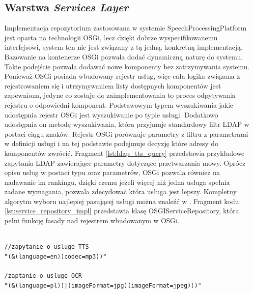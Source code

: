 \subsection{Warstwa \textit{Services Layer}}

Implementacja repozytorium zastosowana w systemie SpeechProcessingPlatform jest oparta na technologii OSGi, lecz dzięki dobrze wyspecifikowanemu interfejsowi, system ten nie jest związany z tą jedną, konkretną implementacją. Bazowanie na kontenerze OSGi pozwala dodać dynamiczną naturę do systemu. Takie podejście pozwala dodawać nowe komponenty bez zatrzymywania systemu. Ponieważ OSGi posiada wbudowany rejestr usług, więc cała logika związana z rejestrowaniem się i utrzymywaniem listy dostępnych komponentów jest zapewniona, jedyne co zostaje do zaimplementowania to proces odpytywania rejestru o odpowiedni komponent. Podstawowym typem wyszukiwania jakie udostępnia rejestr OSGi jest wyszukiwanie po typie usługi. Dodatkowo udostępnia on metodę wyszukiwania, która przyjmuje standardowy filtr LDAP \cite{ldaprfc1996} w postaci ciągu znaków. Rejestr OSGi porównuje parametry z filtru z parametrami w definicji usługi i na tej podstawie podejmuje decyzję które adresy do komponentów zwrócić. Fragment \ref{lst:ldap_tts_query} przedstawia przykładowe zapytania LDAP zawierające parametry dotyczące przetwarzania mowy. Oprócz opisu usług w postaci typu oraz parametrów, OSGi pozwala również na nadawanie im rankingu, dzięki czemu jeżeli więcej niż jedna usługa spełnia zadane wymagania, pozwala zdecydować która usługa jest lepszy. Kompletny algorytm wyboru najlepiej pasującej usługi można znaleźć w \cite{hall2011}. Fragment kodu \ref{lst:service_repository_impl} przedstawia klasę OSGIServiceRepository, która pełni funkcję fasady nad rejestrem wbudowanym w OSGi.

\lstset{language=Java, tabsize=4, caption=Przykładowe zapytania LDAP zawierające parametry dotyczące usług przetwarzania mowy. ,label=lst:ldap_tts_query}

\begin{center}
\begin{lstlisting}

//zapytanie o usluge TTS
"(&(language=en)(codec=mp3))"

/zaptanie o usluge OCR
"(&(language=pl)(|(imageFormat=jpg)(imageFormat=jpeg)))"


\end{lstlisting}
\end{center}

\lstset{language=Java, tabsize=4, caption=Częściowa definicja klasy OSGIServiceRepository będącą fasadą nad Rejestrem OSGi. ,label=lst:service_repository_impl}

